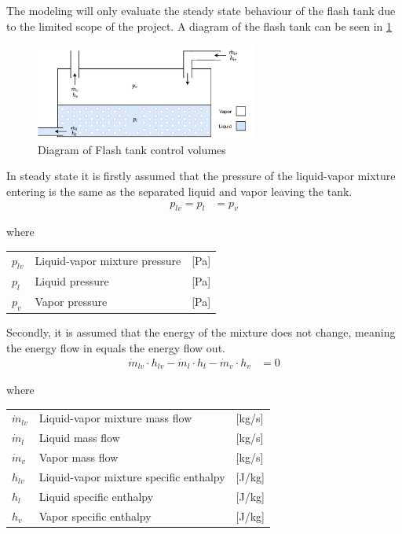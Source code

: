 The modeling will only evaluate the steady state behaviour of the flash tank due to the limited scope of the project. A diagram of the flash tank can be seen in \cref{fig:flash_tank_CV}

\begin{figure}[h!]
	\centering
	\includegraphics[width=0.65\textwidth]{Graphics/Flash_tank.pdf}
	\caption{Diagram of Flash tank control volumes}
	\label{fig:flash_tank_CV}
\end{figure}

In steady state it is firstly assumed that the pressure of the liquid-vapor mixture entering is the same as the separated liquid and vapor leaving the tank.
\begin{align}
	p_{lv} 	= p_{l}					&  = p_{v}
	\label{eq:Flash_tank_pressure}
\end{align}

where

\begin{center}
	\begin{tabular}{l p{8cm} l}
		$p_{lv}$				&  Liquid-vapor mixture pressure		& [\si{Pa}]\\
		$p_{l}$					&  Liquid pressure 						& [\si{Pa}] \\
		$p_{v}$					&  Vapor pressure						& [\si{Pa}]\\

	\end{tabular}
\end{center}


Secondly, it is assumed that the energy of the mixture does not change, meaning the energy flow in equals the energy flow out.
\begin{align}
	\dot{m}_{lv} \cdot  h_{lv}  - \dot{m}_{l} \cdot  h_{l} - \dot{m}_{v} \cdot  h_{v} & = 0
	\label{eq:Flash_tank_energyflow}
\end{align}

where

\begin{center}
	\begin{tabular}{l p{8cm} l}
		$\dot{m}_{lv}$			&  Liquid-vapor mixture mass flow			& [\si{kg}/\si{s}]\\
		$\dot{m}_{l}$			&  Liquid mass flow 						& [\si{kg}/\si{s}] \\
		$\dot{m}_{v}$			&  Vapor mass flow							& [\si{kg}/\si{s}]\\
		$h_{lv}$				&  Liquid-vapor mixture specific enthalpy	& [\si{J}/\si{kg}]\\
		$h_{l}$					&  Liquid specific enthalpy 				& [\si{J}/\si{kg}] \\
		$h_{v}$					&  Vapor specific enthalpy					& [\si{J}/\si{kg}]\\

	\end{tabular}
\end{center}


